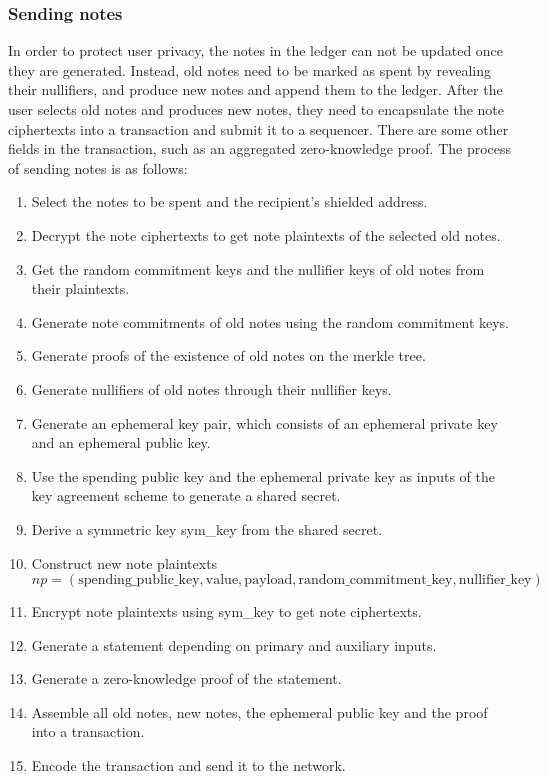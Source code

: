\subsubsection{Sending notes}\label{section: sending-notes}

In order to protect user privacy, the notes in the ledger can not be updated once they are generated. Instead, old notes need to be marked as spent by revealing their nullifiers, and produce new notes and append them to the ledger.
After the user selects old notes and produces new notes, they need to encapsulate the note ciphertexts into a transaction and submit it to a sequencer. There are some other fields in the transaction, such as an aggregated zero-knowledge proof. The process of sending notes is as follows:

\begin{enumerate}
    \item Select the notes to be spent and the recipient's shielded address.
    \item Decrypt the note ciphertexts to get note plaintexts of the selected old notes.
    \item Get the random commitment keys and the nullifier keys of old notes from their plaintexts.
    \item Generate note commitments of old notes using the random commitment keys.
    \item Generate proofs of the existence of old notes on the merkle tree.
    \item Generate nullifiers of old notes through their nullifier keys.
    \item Generate an ephemeral key pair, which consists of an ephemeral private key and an ephemeral public key.
    \item Use the spending public key and the ephemeral private key as inputs of the key agreement scheme to generate a shared secret.
    \item Derive a symmetric key sym\_key from the shared secret.
    \item Construct new note plaintexts $$np = (\text{spending\_public\_key}, \text{value}, \text{payload}, \text{random\_commitment\_key}, \text{nullifier\_key})$$
    \item Encrypt note plaintexts using sym\_key to get note ciphertexts.
    \item Generate a statement depending on primary and auxiliary inputs.
    \item Generate a zero-knowledge proof of the statement.
    \item Assemble all old notes, new notes, the ephemeral public key and the proof into a transaction.
    \item Encode the transaction and send it to the network.
\end{enumerate}
